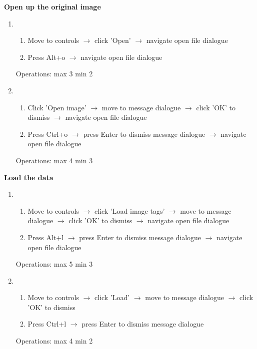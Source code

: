 \documentclass[a4paper,11pt,oneside]{article}
\begin{document}
{\bf Open up the original image}
\begin{enumerate}
    \item
    \begin{enumerate}
        \item Move to controls $\rightarrow$ click 'Open' $\rightarrow$ navigate open file dialogue
        \item Press Alt+o $\rightarrow$ navigate open file dialogue
    \end{enumerate}
    Operations: max 3 min 2
    \item
    \begin{enumerate}
        \item Click 'Open image' $\rightarrow$ move to message dialogue $\rightarrow$ click 'OK' to dismiss $\rightarrow$ navigate open file dialogue
        \item Press Ctrl+o $\rightarrow$ press Enter to dismiss message dialogue $\rightarrow$ navigate open file dialogue
    \end{enumerate}
    Operations: max 4 min 3
\end{enumerate}

{\bf Load the data}
\begin{enumerate}
    \item
    \begin{enumerate}
        \item Move to controls $\rightarrow$ click 'Load image tags' $\rightarrow$ move to message dialogue $\rightarrow$ click 'OK' to dismiss $\rightarrow$ navigate open file dialogue
        \item Press Alt+l $\rightarrow$ press Enter to dismiss message dialogue $\rightarrow$ navigate open file dialogue
    \end{enumerate}
    Operations: max 5 min 3
    \item
    \begin{enumerate}
        \item Move to controls $\rightarrow$ click 'Load' $\rightarrow$ move to message dialogue $\rightarrow$ click 'OK' to dismiss
        \item Press Ctrl+l $\rightarrow$ press Enter to dismiss message dialogue
    \end{enumerate}
    Operations: max 4 min 2
\end{enumerate}
\end{document}
